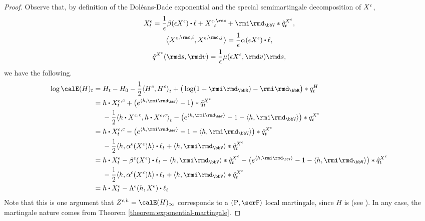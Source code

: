 \begin{proof}
  Observe that, by definition of the Dol\'eans-Dade exponential and the special semimartingale decomposition of $X^\epsilon$,
  \begin{gather*}
    \Xee_t = \frac1\epsilon \affDrift(\Xe) \shortInt \leb + {\Xee}^{,\rmc}_t + \id_\vecSpace \ast \compensate{\jumpMeas^{\Xee}}_t,  \\
    \bprj{{\Xee}^{,\rmc,i}}{{\Xee}^{,\rmc,j}} = \frac1\epsilon\affDiff(\Xe) \shortInt \leb, \\
    \predproj{\jumpMeas^{\Xee}}(\rmd s, \rmd\markVar) = \frac1\epsilon \affJump(\Xe, \rmd\markVar) \rmd s,
  \end{gather*}
  we have the following.
  \begin{align*}
    \log\calE(H)_t
    &= H_t - H_0 - \frac12 \prj{H^c}{H^c}_t + \big( \log(1+\id_\bbR) - \id_\bbR \big) \ast \jumpMeas^H_t \\
    &=\begin{aligned}[t]
      &\twistFunc \shortInt {\Xee_t}^{,c} + \big( e^\prj{\twistFunc}{\id_\vecSpace} - 1 \big) \ast \compensate{\jumpMeas^{\Xee}}_t \\
      &- \frac12 \prj{\twistFunc \shortInt {\Xee}^{,c}}{\twistFunc \shortInt {\Xee}^{,c}}_t - \big( e^\prj{\twistFunc}{\id_\vecSpace} - 1 -\prj{\twistFunc}{\id_\vecSpace}\big) \ast \jumpMeas^{\Xee}_t
    \end{aligned} \\
    &=\begin{aligned}[t]
      &\twistFunc \shortInt {\Xee_t}^{,c} - \big( e^\prj{\twistFunc}{\id_\vecSpace} - 1  - \prj{\twistFunc}{\id_\vecSpace}\big) \ast \predproj{\jumpMeas^{\Xee}}_t \\
      &- \frac12 \prj{\twistFunc}{\affDiff^\epsilon(\Xee)\twistFunc} \shortInt \leb_t + \prj{\twistFunc}{\id_\vecSpace} \ast \compensate{\jumpMeas^{\Xee}}_t
    \end{aligned} \\
    &=\begin{aligned}[t]
      &\twistFunc \shortInt \Xee_t - \affDrift^\epsilon(\Xee) \shortInt \leb_t - \prj{\twistFunc}{\id_\vecSpace} \ast \compensate{\jumpMeas^{\Xee}}_t - \big( e^\prj{\twistFunc}{\id_\vecSpace} - 1  - \prj{\twistFunc}{\id_\vecSpace}\big) \ast \predproj{\jumpMeas^{\Xee}}_t \\
      &- \frac12 \prj{\twistFunc}{\affDiff^\epsilon(\Xee)\twistFunc} \shortInt \leb_t + \prj{\twistFunc}{\id_\vecSpace} \ast \compensate{\jumpMeas^{\Xee}}_t
    \end{aligned} \\
    &= \twistFunc \shortInt \Xee_t - \ode^\epsilon(\twistFunc, \Xee) \shortInt \leb_t
  \end{align*}
  Note that this is one argument that $\mgDensity^{\epsilon,\twistFunc} = \calE(H)_\infty$ corresponds to a $(\Prb, \scrF)$ local martingale, since $H$ is (see \cite[Theorem I.4.61(b)]{jacod2003}).
  In any case, the martingale nature comes from Theorem \ref{theorem:exponential-martingale}.
\end{proof}
